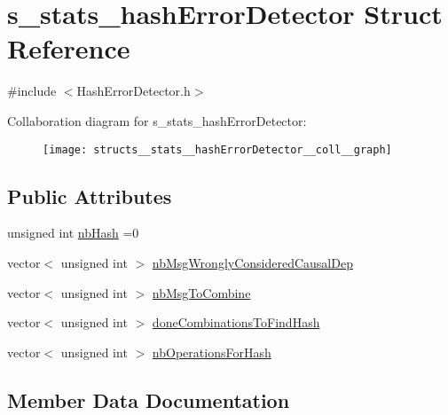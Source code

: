 \hypertarget{structs__stats__hashErrorDetector}{}\section{s\+\_\+stats\+\_\+hash\+Error\+Detector Struct Reference}
\label{structs__stats__hashErrorDetector}


{\ttfamily \#include $<$Hash\+Error\+Detector.\+h$>$}



Collaboration diagram for s\+\_\+stats\+\_\+hash\+Error\+Detector\+:\nopagebreak
\begin{figure}[H]
\begin{center}
\leavevmode
\texttt{[image: structs\_\_stats\_\_hashErrorDetector\_\_coll\_\_graph]}
\end{center}
\end{figure}
\subsection*{Public Attributes}
\begin{DoxyCompactItemize}
\item 
unsigned int \hyperlink{structs__stats__hashErrorDetector_a10b1af7c249bf232e739b50c5faed021}{nb\+Hash} =0
\item 
vector$<$ unsigned int $>$ \hyperlink{structs__stats__hashErrorDetector_ac8f99ce678b3938dc049ff074040b999}{nb\+Msg\+Wrongly\+Considered\+Causal\+Dep}
\item 
vector$<$ unsigned int $>$ \hyperlink{structs__stats__hashErrorDetector_ab765b1ecec0ec33fec5968fb28d5e4fb}{nb\+Msg\+To\+Combine}
\item 
vector$<$ unsigned int $>$ \hyperlink{structs__stats__hashErrorDetector_a82622eb0b2a4d41fc33df25c6360dc79}{done\+Combinations\+To\+Find\+Hash}
\item 
vector$<$ unsigned int $>$ \hyperlink{structs__stats__hashErrorDetector_a64dab27e3314cfc2a233f620f0309782}{nb\+Operations\+For\+Hash}
\end{DoxyCompactItemize}


\subsection{Member Data Documentation}
\mbox{\label{structs__stats__hashErrorDetector_a82622eb0b2a4d41fc33df25c6360dc79}} 
